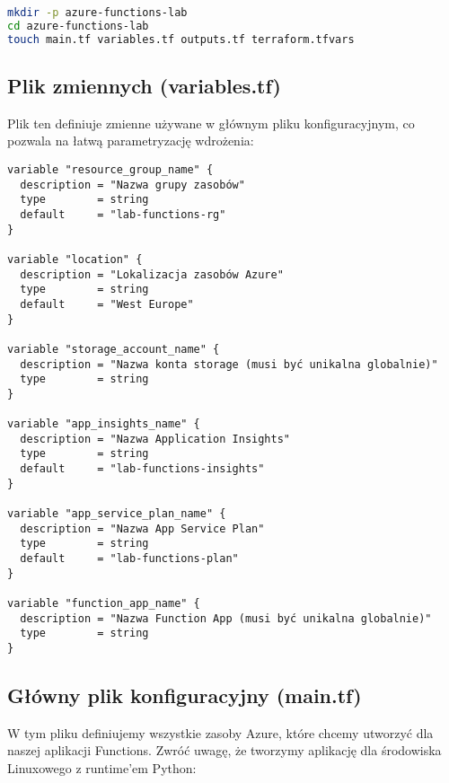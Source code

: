 \documentclass{article}
\begin{document}
\begin{lstlisting}[language=bash]
mkdir -p azure-functions-lab
cd azure-functions-lab
touch main.tf variables.tf outputs.tf terraform.tfvars
\end{lstlisting}

\subsection{Plik zmiennych (variables.tf)}

Plik ten definiuje zmienne używane w głównym pliku konfiguracyjnym, co pozwala na łatwą parametryzację wdrożenia:

\begin{lstlisting}[language=HCL]
variable "resource_group_name" {
  description = "Nazwa grupy zasobów"
  type        = string
  default     = "lab-functions-rg"
}

variable "location" {
  description = "Lokalizacja zasobów Azure"
  type        = string
  default     = "West Europe"
}

variable "storage_account_name" {
  description = "Nazwa konta storage (musi być unikalna globalnie)"
  type        = string
}

variable "app_insights_name" {
  description = "Nazwa Application Insights"
  type        = string
  default     = "lab-functions-insights"
}

variable "app_service_plan_name" {
  description = "Nazwa App Service Plan"
  type        = string
  default     = "lab-functions-plan"
}

variable "function_app_name" {
  description = "Nazwa Function App (musi być unikalna globalnie)"
  type        = string
}
\end{lstlisting}

\subsection{Główny plik konfiguracyjny (main.tf)}

W tym pliku definiujemy wszystkie zasoby Azure, które chcemy utworzyć dla naszej aplikacji Functions. Zwróć uwagę, że tworzymy aplikację dla środowiska Linuxowego z runtime'em Python:
\end{document}

